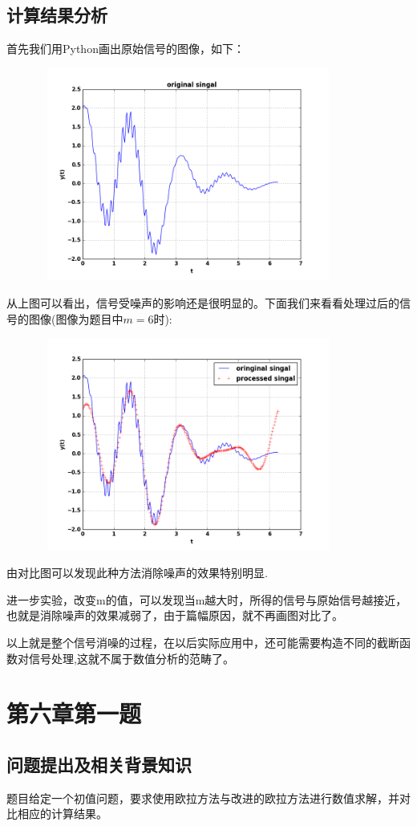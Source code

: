 \documentclass[10pt,a4paper]{ctexart}
\begin{document}
\subsection{计算结果分析}
首先我们用Python画出原始信号的图像，如下：
\par
\centerline{\includegraphics[height=7cm,width=12cm]{singal0.png}}
\par
从上图可以看出，信号受噪声的影响还是很明显的。下面我们来看看处理过后的信号的图像(图像为题目中$m=6$时):
\par
\centerline{\includegraphics[height=7cm,width=12cm]{singal1.png}}
\par
由对比图可以发现此种方法消除噪声的效果特别明显.

进一步实验，改变m的值，可以发现当m越大时，所得的信号与原始信号越接近，也就是消除噪声的效果减弱了，由于篇幅原因，就不再画图对比了。

以上就是整个信号消噪的过程，在以后实际应用中，还可能需要构造不同的截断函数对信号处理,这就不属于数值分析的范畴了。
\section{第六章第一题}
\subsection{问题提出及相关背景知识}
题目给定一个初值问题，要求使用欧拉方法与改进的欧拉方法进行数值求解，并对比相应的计算结果。
\end{document}
